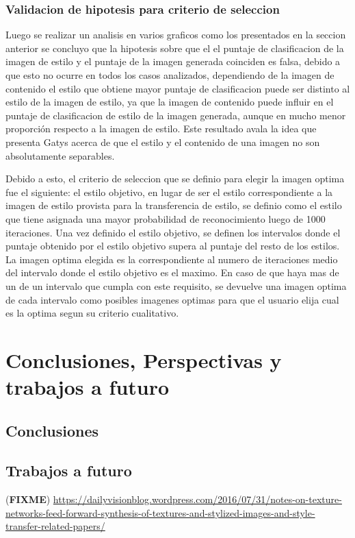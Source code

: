 \documentclass[a4paper,11pt,spanish]{book}
\newcommand*{\FIXME}[1]{{(\textbf{FIXME}) {#1}}}
\begin{document}
    \subsection{Validacion de hipotesis para criterio de seleccion}
      Luego se realizar un analisis en varios graficos como los presentados en la seccion anterior se concluyo que la hipotesis sobre que el el puntaje de clasificacion de la imagen
      de estilo y el puntaje de la imagen generada coinciden es falsa, debido a que esto no ocurre en todos los casos analizados, dependiendo de la imagen de contenido el estilo
      que obtiene mayor puntaje de clasificacion puede ser distinto al estilo de la imagen de estilo, ya que la imagen de contenido puede influir en el puntaje de clasificacion de estilo
      de la imagen generada, aunque en mucho menor proporción respecto a la imagen de estilo. Este resultado avala la idea que presenta Gatys acerca de que el estilo y el contenido de una
      imagen no son absolutamente separables.
      
      Debido a esto, el criterio de seleccion que se definio para elegir la imagen optima fue el siguiente: el estilo objetivo, en lugar de ser el estilo correspondiente a la imagen de estilo
      provista para la transferencia de estilo, se definio como el estilo que tiene asignada una mayor
      probabilidad de reconocimiento luego de 1000 iteraciones. Una vez definido el estilo objetivo, se definen los intervalos donde el puntaje obtenido por el estilo objetivo
      supera al puntaje del resto de los estilos. La imagen optima elegida es la correspondiente al numero de iteraciones medio del intervalo donde el estilo objetivo es el maximo. En caso de que haya mas de un de
      un intervalo que cumpla con este requisito, se devuelve una imagen optima de cada intervalo como posibles imagenes optimas para que el usuario elija cual es la optima segun su criterio
      cualitativo.


\chapter{Conclusiones, Perspectivas y trabajos a futuro}
  \section{Conclusiones}
  \section{Trabajos a futuro}
    \FIXME{ \url{https://dailyvisionblog.wordpress.com/2016/07/31/notes-on-texture-networks-feed-forward-synthesis-of-textures-and-stylized-images-and-style-transfer-related-papers/}}
\end{document}
